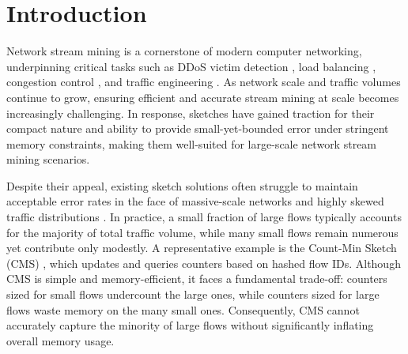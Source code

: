 \section{Introduction}

Network stream mining is a cornerstone of modern computer networking, underpinning critical tasks such as DDoS victim detection \cite{poseidon, jaqen}, load balancing \cite{conga, silkroad}, congestion control \cite{hpcc}, and traffic engineering \cite{hedera, aasclepius}. As network scale and traffic volumes continue to grow, ensuring efficient and accurate stream mining at scale becomes increasingly challenging. In response, sketches \cite{bloomfilter, cmsketch, cusketch, csketch} have gained traction for their compact nature and ability to provide small-yet-bounded error under stringent memory constraints, making them well-suited for large-scale network stream mining scenarios.




Despite their appeal, existing sketch solutions often struggle to maintain acceptable error rates in the face of massive-scale networks and highly skewed traffic distributions \cite{cusketch, imcdc}. In practice, a small fraction of large flows typically accounts for the majority of total traffic volume, while many small flows remain numerous yet contribute only modestly. A representative example is the Count-Min Sketch (CMS) \cite{cmsketch}, which updates and queries counters based on hashed flow IDs. Although CMS is simple and memory-efficient, it faces a fundamental trade-off: counters sized for small flows undercount the large ones, while counters sized for large flows waste memory on the many small ones. Consequently, CMS cannot accurately capture the minority of large flows without significantly inflating overall memory usage.




